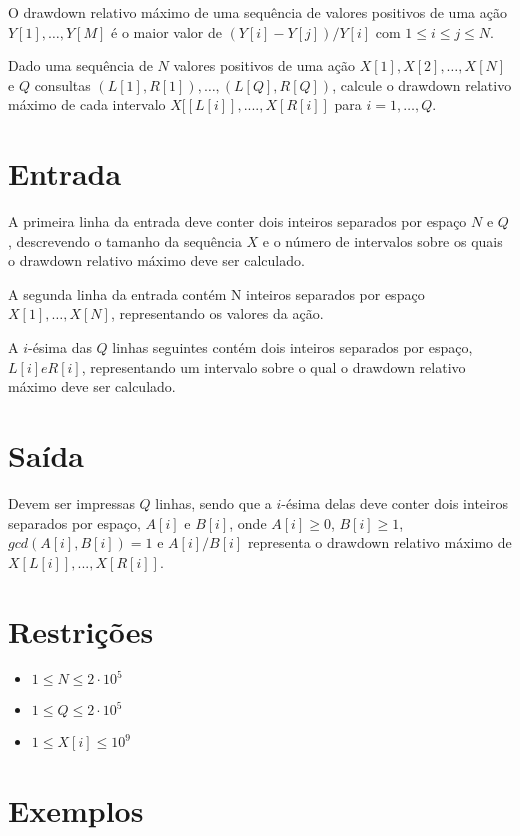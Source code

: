 O drawdown relativo máximo de uma sequência de valores positivos de uma ação $Y[1], \dots, Y[M]$ é o maior valor de $(Y[i] - Y[j])/Y[i]$ com $1 \leq i \leq j \leq N$.

Dado uma sequência de $N$ valores positivos de uma ação $X[1], X[2], \dots, X[N]$ e $Q$ consultas $(L[1], R[1]), \dots, (L[Q], R[Q])$, calcule o drawdown relativo máximo de cada intervalo $X[[L[i]], ...., X[R[i]]$ para $i = 1, \dots, Q$.

\section*{Entrada}

A primeira linha da entrada deve conter dois inteiros separados por espaço $N$ e $Q$, descrevendo o tamanho da sequência $X$ e o número de intervalos sobre os quais o drawdown relativo máximo deve ser calculado.

A segunda linha da entrada contém N inteiros separados por espaço $X[1], \dots, X[N]$, representando os valores da ação.

A $i$-ésima das $Q$ linhas seguintes contém dois inteiros  separados por espaço, $L[i] e R[i]$, representando um intervalo sobre o qual o drawdown relativo máximo deve ser calculado.

\section*{Saída}

Devem ser impressas $Q$ linhas, sendo que a $i$-ésima delas deve conter dois inteiros  separados por espaço, $A[i]$ e $B[i]$, onde $A[i] \geq 0$, $B[i] \geq 1$, $gcd(A[i], B[i]) = 1$ e $A[i] / B[i]$ representa o drawdown relativo máximo de $X[L[i]], ..., X[R[i]]$.

\section*{Restrições}

\begin{itemize}
\item $1 \leq N \leq 2 \cdot 10^5$
\item $1 \leq Q \leq 2 \cdot 10^5$
\item $1 \leq X[i] \leq 10^9$
\end{itemize}


\section*{Exemplos}

\exemplo
